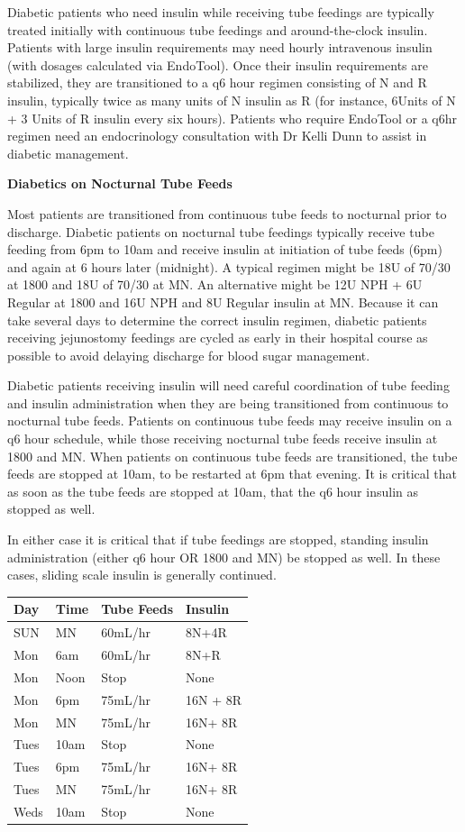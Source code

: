 \documentclass[
]{book}
\begin{document}
Diabetic patients who need insulin while receiving tube feedings are typically treated initially with continuous tube feedings and around-the-clock insulin. Patients with large insulin requirements may need hourly intravenous insulin (with dosages calculated via EndoTool). Once their insulin requirements are stabilized, they are transitioned to a q6 hour regimen consisting of N and R insulin, typically twice as many units of N insulin as R (for instance, 6Units of N + 3 Units of R insulin every six hours). Patients who require EndoTool or a q6hr regimen need an endocrinology consultation with Dr Kelli Dunn to assist in diabetic management.

\textbf{Diabetics on Nocturnal Tube Feeds}

Most patients are transitioned from continuous tube feeds to nocturnal prior to discharge. Diabetic patients on nocturnal tube feedings typically receive tube feeding from 6pm to 10am and receive insulin at initiation of tube feeds (6pm) and again at 6 hours later (midnight). A typical regimen might be 18U of 70/30 at 1800 and 18U of 70/30 at MN. An alternative might be 12U NPH + 6U Regular at 1800 and 16U NPH and 8U Regular insulin at MN. Because it can take several days to determine the correct insulin regimen, diabetic patients receiving jejunostomy feedings are cycled as early in their hospital course as possible to avoid delaying discharge for blood sugar management.

Diabetic patients receiving insulin will need careful coordination of tube feeding and insulin administration when they are being transitioned from continuous to nocturnal tube feeds. Patients on continuous tube feeds may receive insulin on a q6 hour schedule, while those receiving nocturnal tube feeds receive insulin at 1800 and MN. When patients on continuous tube feeds are transitioned, the tube feeds are stopped at 10am, to be restarted at 6pm that evening. It is critical that as soon as the tube feeds are stopped at 10am, that the q6 hour insulin as stopped as well.

In either case it is critical that if tube feedings are stopped, standing insulin administration (either q6 hour OR 1800 and MN) be stopped as well. In these cases, sliding scale insulin is generally continued.

\begin{longtable}[]{@{}llll@{}}
\toprule\noalign{}
Day & Time & Tube Feeds & Insulin \\
\midrule\noalign{}
\endhead
\bottomrule\noalign{}
\endlastfoot
SUN & MN & 60mL/hr & 8N+4R \\
Mon & 6am & 60mL/hr & 8N+R \\
Mon & Noon & Stop & None \\
Mon & 6pm & 75mL/hr & 16N + 8R \\
Mon & MN & 75mL/hr & 16N+ 8R \\
Tues & 10am & Stop & None \\
Tues & 6pm & 75mL/hr & 16N+ 8R \\
Tues & MN & 75mL/hr & 16N+ 8R \\
Weds & 10am & Stop & None \\
\end{longtable}
\end{document}
